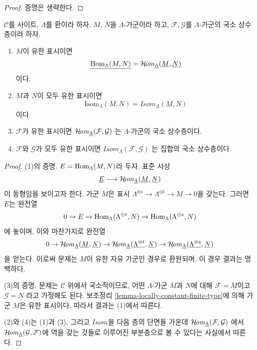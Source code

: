 \begin{proof}
증명은 생략한다.
\end{proof}

\begin{lemma}
\label{lemma-locally-constant}
$\mathcal{C}$를 사이트, $\Lambda$를 환이라 하자.
$M$, $N$을 $\Lambda$-가군이라 하고,
$\mathcal{F}, \mathcal{G}$를 $\Lambda$-가군의 국소 상수층이라 하자.
\begin{enumerate}
\item $M$이 유한 표시이면
$$
\underline{\mathop{\mathrm{Hom}}\nolimits_\Lambda(M, N)} =
\mathop{\mathcal{H}\!\mathit{om}}\nolimits_{\underline{\Lambda}}(\underline{M}, \underline{N})
$$
이다.
\item $M$과 $N$이 모두 유한 표시이면
$$
\underline{\text{Isom}_\Lambda(M, N)} =
\mathit{Isom}_{\underline{\Lambda}}(\underline{M}, \underline{N})
$$
이다.
\item $\mathcal{F}$가 유한 표시이면
$\mathop{\mathcal{H}\!\mathit{om}}\nolimits_{\underline{\Lambda}}(\mathcal{F}, \mathcal{G})$
는 $\Lambda$-가군의 국소 상수층이다.
\item $\mathcal{F}$와 $\mathcal{G}$가 모두 유한 표시이면
$\mathit{Isom}_{\underline{\Lambda}}(\mathcal{F}, \mathcal{G})$
는 집합의 국소 상수층이다.
\end{enumerate}
\end{lemma}

\begin{proof}
(1)의 증명. $E = \mathop{\mathrm{Hom}}\nolimits_\Lambda(M, N)$라 두자. 표준 사상
$$
\underline{E}
\longrightarrow
\mathop{\mathcal{H}\!\mathit{om}}\nolimits_{\underline{\Lambda}}(\underline{M}, \underline{N})
$$
이 동형임을 보이고자 한다. 가군 $M$은 표시
$\Lambda^{\oplus s} \to \Lambda^{\oplus t} \to M \to 0$을 갖는다.
그러면 $E$는 완전열
$$
0 \to E \to \mathop{\mathrm{Hom}}\nolimits_\Lambda(\Lambda^{\oplus t}, N) \to
\mathop{\mathrm{Hom}}\nolimits_\Lambda(\Lambda^{\oplus s}, N)
$$
에 놓이며, 이와 마찬가지로 완전열
$$
0 \to
\mathop{\mathcal{H}\!\mathit{om}}\nolimits_{\underline{\Lambda}}(\underline{M}, \underline{N}) \to
\mathop{\mathcal{H}\!\mathit{om}}\nolimits_{\underline{\Lambda}}(\underline{\Lambda^{\oplus t}}, \underline{N})
\to
\mathop{\mathcal{H}\!\mathit{om}}\nolimits_{\underline{\Lambda}}(\underline{\Lambda^{\oplus s}}, \underline{N})
$$
을 얻는다. 이로써 문제는 $M$이 유한 자유 가군인 경우로 환원되며,
이 경우 결과는 명백하다.

\medskip\noindent
(3)의 증명. 문제는 $\mathcal{C}$ 위에서 국소적이므로, 어떤
$\Lambda$-가군 $M$과 $N$에 대해
$\mathcal{F} = \underline{M}$이고 $\mathcal{G} = \underline{N}$
라고 가정해도 된다. 보조정리
\ref{lemma-locally-constant-finite-type}에 의해 가군 $M$은
유한 표시이다. 따라서 결과는 (1)에서 따른다.

\medskip\noindent
(2)와 (4)는 (1)과 (3), 그리고 $\mathit{Isom}$을 다음 층의 단면들 가운데
$\mathop{\mathcal{H}\!\mathit{om}}\nolimits_{\underline{\Lambda}}(\mathcal{F}, \mathcal{G})$
에서 $\mathop{\mathcal{H}\!\mathit{om}}\nolimits_{\underline{\Lambda}}(\mathcal{G}, \mathcal{F})$에
역을 갖는 것들로 이루어진 부분층으로 볼 수 있다는 사실에서 따른다.
\end{proof}

